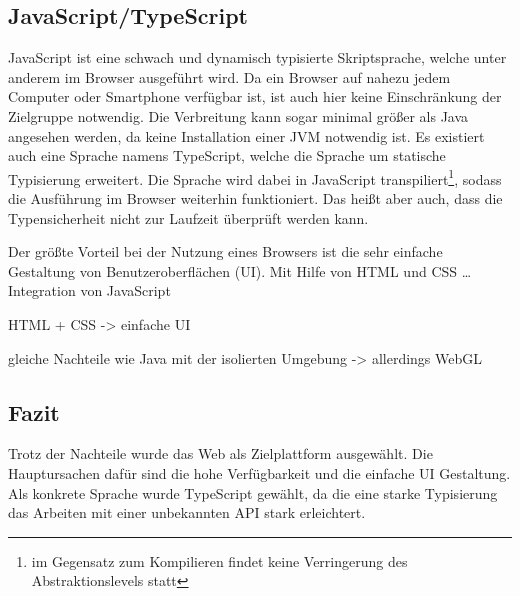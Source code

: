\subsection{JavaScript/TypeScript}
JavaScript ist eine schwach und dynamisch typisierte Skriptsprache, welche unter anderem im Browser ausgeführt wird. Da ein Browser auf nahezu jedem Computer oder Smartphone verfügbar ist, ist auch hier keine Einschränkung der Zielgruppe notwendig. Die Verbreitung kann sogar minimal größer als Java angesehen werden, da keine Installation einer JVM notwendig ist. Es existiert auch eine Sprache namens TypeScript, welche die Sprache um statische Typisierung erweitert. Die Sprache wird dabei in JavaScript transpiliert\footnote{im Gegensatz zum Kompilieren findet keine Verringerung des Abstraktionslevels statt}, sodass die Ausführung im Browser weiterhin funktioniert. Das heißt aber auch, dass die Typensicherheit nicht zur Laufzeit überprüft werden kann.

Der größte Vorteil bei der Nutzung eines Browsers ist die sehr einfache Gestaltung von Benutzeroberflächen (UI). Mit Hilfe von HTML und CSS … Integration von JavaScript

HTML + CSS -> einfache UI

gleiche Nachteile wie Java mit der isolierten Umgebung -> allerdings WebGL


\subsection{Fazit}
Trotz der Nachteile wurde das Web als Zielplattform ausgewählt. Die Hauptursachen dafür sind die hohe Verfügbarkeit und die einfache UI Gestaltung. Als konkrete Sprache wurde TypeScript gewählt, da die eine starke Typisierung das Arbeiten mit einer unbekannten API stark erleichtert.

